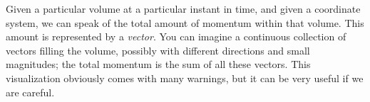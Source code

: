 \documentclass[a4paper,12pt,%
onecolumn,oneside,%
british%
]{memoir}
\renewcommand*{\|}[1][]{\nonscript\:#1\vert\nonscript\:\mathopen{}}
\begin{document}
%
%
Given a particular volume at a particular instant in time, and given a coordinate system, we can speak of the total amount of momentum within that volume. This amount is represented by a \emph{vector}. You can imagine a continuous collection of vectors filling the volume, possibly with different directions and small magnitudes; the total momentum is the sum of all these vectors. This visualization obviously comes with many warnings, but it can be very useful if we are careful.
\end{document}
